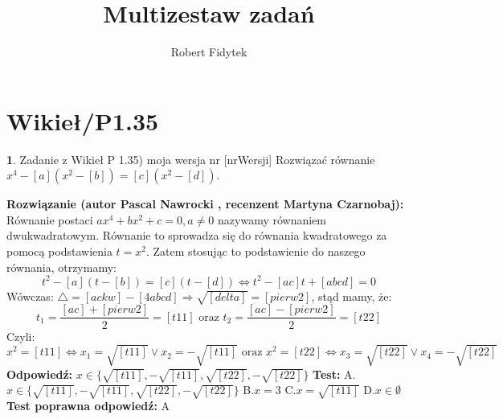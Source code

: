 \documentclass[12pt, a4paper]{article}
\title{Multizestaw zadań}
\author{Robert Fidytek}
\date{}
\theoremstyle{definition} %
\newtheorem{zad}{}
\newcommand{\kategoria}[1]{\section{#1}} %
\newcommand{\zadStart}[1]{\begin{zad}#1\newline} %
\newcommand{\zadStop}{\end{zad}}   %
\newcommand{\rozwStart}[2]{\noindent \textbf{Rozwiązanie (autor #1 , recenzent #2): }\newline} %
\newcommand{\rozwStop}{\newline}                                            %
\newcommand{\odpStart}{\noindent \textbf{Odpowiedź:}\newline}    %
\newcommand{\odpStop}{\newline}                                             %
\newcommand{\testStart}{\noindent \textbf{Test:}\newline} %
\newcommand{\testStop}{\newline} %
\newcommand{\kluczStart}{\noindent \textbf{Test poprawna odpowiedź:}\newline} %
\newcommand{\kluczStop}{\newline} %
\begin{document}
\maketitle


\kategoria{Wikieł/P1.35}
\zadStart{Zadanie z Wikieł P 1.35) moja wersja nr [nrWersji]}
Rozwiązać równanie $x^4-[a](x^2-[b])=[c](x^2-[d])$.
\zadStop
\rozwStart{Pascal Nawrocki}{Martyna Czarnobaj}
Równanie postaci $ax^4+bx^2+c=0, a\neq0$ nazywamy równaniem dwukwadratowym. Równanie to sprowadza się do równania kwadratowego za pomocą podstawienia $t=x^2$. Zatem stosując to podstawienie do naszego równania, otrzymamy: $$ t^2-[a](t-[b])=[c](t-[d])\Leftrightarrow t^2-[ac]t+[abcd]=0$$
Wówczas: $\bigtriangleup=[ackw]-[4abcd]\Rightarrow\sqrt{[delta]}=[pierw2]$, stąd mamy, że:
$$t_1=\frac{[ac]+[pierw2]}{2}=[t11] \text{ oraz } t_2=\frac{[ac]-[pierw2]}{2}=[t22]$$
Czyli:
$$x^2={[t11]}\Leftrightarrow x_1=\sqrt{[t11]} \vee x_2=-\sqrt{[t11]} \text{ oraz } x^2=[t22]\Leftrightarrow x_3=\sqrt{[t22]} \vee x_4=-\sqrt{[t22]}$$
\rozwStop
\odpStart
$x\in\{\sqrt{[t11]},-\sqrt{[t11]},\sqrt{[t22]},-\sqrt{[t22]}\}$
\odpStop
\testStart
A.$x\in\{\sqrt{[t11]},-\sqrt{[t11]},\sqrt{[t22]},-\sqrt{[t22]}\}$
B.$x=3$
C.$x=\sqrt{[t11]}$
D.$x\in \emptyset$
\testStop
\kluczStart
A
\kluczStop
\end{document}
